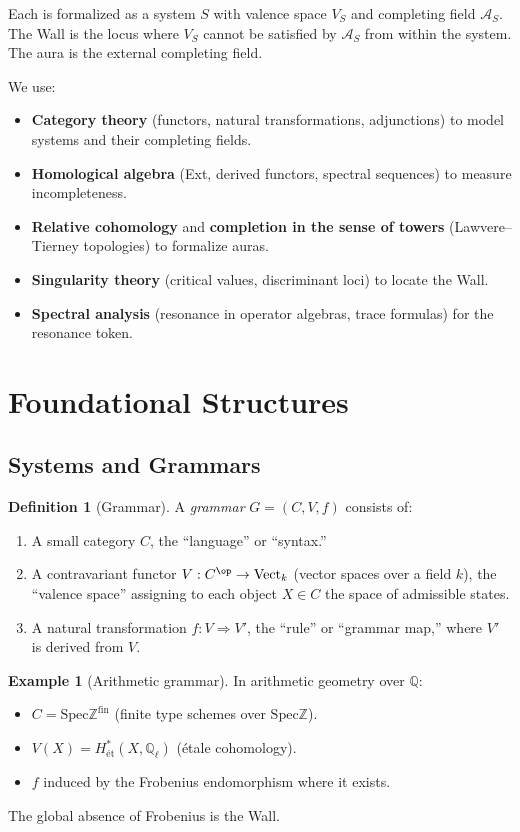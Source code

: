 \documentclass[12pt]{article}
\theoremstyle{definition}
\newtheorem{definition}[theorem]{Definition}
\newtheorem{example}[theorem]{Example}
\theoremstyle{remark}
\newcommand{\Spec}{\mathrm{Spec}}
\begin{document}
Each is formalized as a system $S$ with valence space $V_S$ and completing field $\mathcal{A}_S$. The Wall is the locus where $V_S$ cannot be satisfied by $\mathcal{A}_S$ from within the system. The aura is the external completing field.

We use:
\begin{itemize}
\item \textbf{Category theory} (functors, natural transformations, adjunctions) to model systems and their completing fields.
\item \textbf{Homological algebra} (Ext, derived functors, spectral sequences) to measure incompleteness.
\item \textbf{Relative cohomology} and \textbf{completion in the sense of towers} (Lawvere--Tierney topologies) to formalize auras.
\item \textbf{Singularity theory} (critical values, discriminant loci) to locate the Wall.
\item \textbf{Spectral analysis} (resonance in operator algebras, trace formulas) for the resonance token.
\end{itemize}

\section{Foundational Structures}

\subsection{Systems and Grammars}

\begin{definition}[Grammar]
A \emph{grammar} $G = (C, V, f)$ consists of:
\begin{enumerate}
\item A small category $C$, the ``language'' or ``syntax.''
\item A contravariant functor $V : C^{\op} \to \mathrm{Vect}_k$ (vector spaces over a field $k$), the ``valence space'' assigning to each object $X \in C$ the space of admissible states.
\item A natural transformation $f : V \Rightarrow V'$, the ``rule'' or ``grammar map,'' where $V'$ is derived from $V$.
\end{enumerate}
\end{definition}

\begin{example}[Arithmetic grammar]
In arithmetic geometry over $\mathbb{Q}$:
\begin{itemize}
\item $C = \Spec \mathbb{Z}^{\mathrm{fin}}$ (finite type schemes over $\Spec \mathbb{Z}$).
\item $V(X) = H^*_{\text{\'et}}(X, \mathbb{Q}_\ell)$ (\'etale cohomology).
\item $f$ induced by the Frobenius endomorphism where it exists.
\end{itemize}
The global absence of Frobenius is the Wall.
\end{example}
\end{document}
